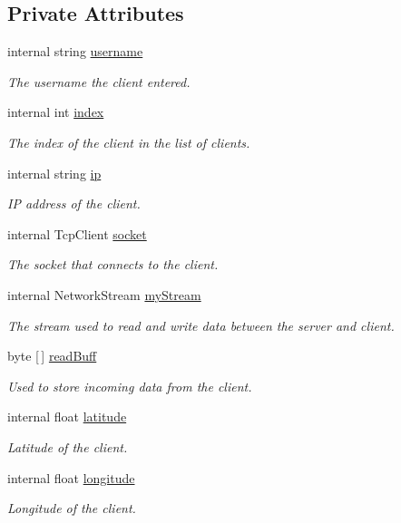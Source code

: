 \subsection*{Private Attributes}
\begin{DoxyCompactItemize}
\item 
internal string \mbox{\hyperlink{class_client_a39cd630c426203cd9b745af7e69260a9}{username}}
\begin{DoxyCompactList}\small\item\em The username the client entered. \end{DoxyCompactList}\item 
internal int \mbox{\hyperlink{class_client_a6ab52bf1fa672997e9243de8387e7571}{index}}
\begin{DoxyCompactList}\small\item\em The index of the client in the list of clients. \end{DoxyCompactList}\item 
internal string \mbox{\hyperlink{class_client_a0dd1d2611594605d76dc9c6b99182edd}{ip}}
\begin{DoxyCompactList}\small\item\em IP address of the client. \end{DoxyCompactList}\item 
internal Tcp\+Client \mbox{\hyperlink{class_client_a01727b6e955e0735f26d6ccc8ba7b4c0}{socket}}
\begin{DoxyCompactList}\small\item\em The socket that connects to the client. \end{DoxyCompactList}\item 
internal Network\+Stream \mbox{\hyperlink{class_client_ac49f1e7df64018a7f6589fa216f1628e}{my\+Stream}}
\begin{DoxyCompactList}\small\item\em The stream used to read and write data between the server and client. \end{DoxyCompactList}\item 
byte \mbox{[}$\,$\mbox{]} \mbox{\hyperlink{class_client_ab0bcc2e82b84e460013e0789e485bb05}{read\+Buff}}
\begin{DoxyCompactList}\small\item\em Used to store incoming data from the client. \end{DoxyCompactList}\item 
internal float \mbox{\hyperlink{class_client_a4b6690d643731c2f872ef4803339aec3}{latitude}}
\begin{DoxyCompactList}\small\item\em Latitude of the client. \end{DoxyCompactList}\item 
internal float \mbox{\hyperlink{class_client_ae67bee3b41d13425dc3a023778cb46fd}{longitude}}
\begin{DoxyCompactList}\small\item\em Longitude of the client. \end{DoxyCompactList}\end{DoxyCompactItemize}


